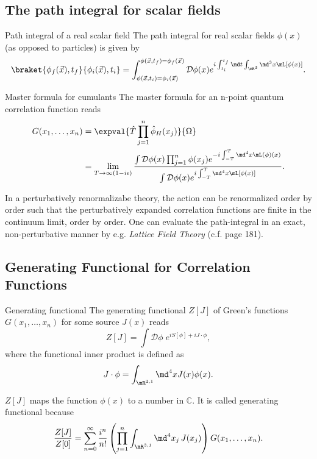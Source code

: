 \subsection{The path integral for scalar fields}
\begin{mybox}{Path integral of a real scalar field}
The path integral for real scalar fields $\phi(x)$ (as opposed to particles) is given by
\begin{equation}
	\braket{\phi_f(\vec{x} ),t_f }{\phi_i(\vec{x}),t_i} = \int_{\phi(\vec{x},t_i) = \phi_i(\vec{x})}^{\phi(\vec{x},t_f)=\phi_f(\vec{x})} \mathcal{D}\phi(x) e^{i \int_{t_i}^{t_f} \md t \int_{\mR^3} \md^3 x \mL[\phi(x)]}.
\end{equation}
\end{mybox}
\begin{mybox}{Master formula for cumulants}
	The master formula for an n-point quantum correlation function reads
	\begin{align}
		G(x_1,\dots,x_n) &= \expval{\hat{T} \prod_{j=1}^{n} \hat{\phi}_H(x_j) }{\Omega} \nonumber\\
		&= \lim_{T\rightarrow\infty(1-i\epsilon)} \frac{\int \mathcal{D}\phi(x) \prod_{j=1}^{n} \phi(x_j) e^{-i \int_{-T}^T \md^4 x \mL(\phi)(x) } }{\int \mathcal{D}\phi(x) e^{i \int_{-T}^T \md^4 x \mL [\phi(x)]}}.
	\end{align}
\end{mybox}
In a perturbatively renormalizabe theory, the action can be renormalized order by order such that the perturbatively expanded correlation functions are finite in the continuum limit, order by order. One can evaluate the path-integral in an exact, non-perturbative manner by e.g. \emph{Lattice Field Theory} (c.f. page 181).








\subsection{Generating Functional for Correlation Functions}
\begin{mybox}{Generating functional}
	The generating functional $Z[J]$ of Green's functions $G(x_1, \dots, x_n)$ for some source $J(x)$ reads
	\begin{equation}
	Z[J] = \int \mathcal{D}\phi \; e^{i S[\phi] + i J \cdot \phi },
	\end{equation}
	where the functional inner product is defined as
	\begin{equation}
	J \cdot \phi = \int_{\mR^{3,1}} \md^4 x J(x)\phi(x).
	\end{equation}
\end{mybox}
$Z[J]$ maps the function $\phi(x)$ to a number in $\mathbb{C}$. It is called generating functional because
\begin{equation}
\frac{Z[J]}{Z[0]} = \sum_{n=0}^{\infty} \frac{i^n}{n!} \left(\prod_{j=1}^{n} \int_{\mR^{3,1}} \md^4 x_j \, J(x_j) \right)G(x_1,\dots,x_n).
\end{equation}

